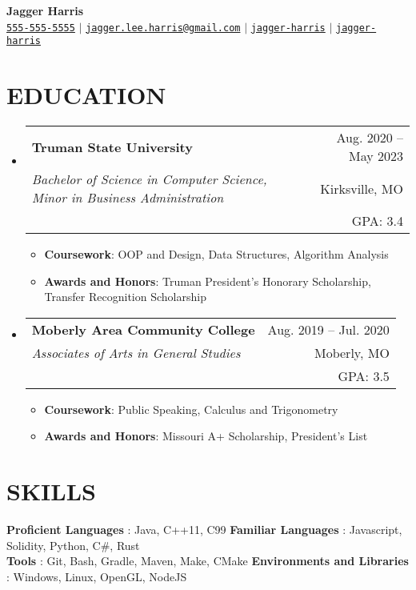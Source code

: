 \documentclass[letterpaper,11pt]{article}
\makeatletter
\newcommand{\resumeItem}[1]{
  \item\small{
    {#1 \vspace{-1pt}}
  }
}
\newcommand{\resumeSubheading}[5]{
  \vspace{-1pt}\item
    \begin{tabular*}{\textwidth}[t]{l@{\extracolsep{\fill}}r}
      \textbf{#1} & {\color{dark-grey}\small #2}\vspace{1pt}\\ %
      \textit{#3} & {\color{dark-grey} \small #4}\vspace{1pt}\\ %
      & \color{dark-grey} \small #5
    \end{tabular*}\vspace{-20pt}
}
\newcommand{\resumeSubHeadingListStart}{\begin{itemize}[leftmargin=0in, label={}]}
\newcommand{\resumeSubHeadingListEnd}{\end{itemize}}
\newcommand{\resumeItemListStart}{\begin{itemize}\setlength{\itemindent}{-1em}}
\newcommand{\resumeItemListEnd}{\end{itemize}\vspace{0pt}}
\makeatother
\begin{document}
\begin{center}
	\textbf{\Huge Jagger Harris} \\ \vspace{5pt}
	\small \faPhone* \texttt{\href{tel:+1555-555-5555}{555-555-5555}} \hspace{1pt} $|$
	\hspace{1pt} \faEnvelope \hspace{2pt} \texttt{\href{mailto:jagger.lee.harris@gmail.com}{jagger.lee.harris@gmail.com}} \hspace{1pt} $|$
	\hspace{1pt} \faGithub \hspace{2pt} \texttt{\href{https://github.com/jagger-harris}{jagger-harris}} \hspace{1pt} $|$
	\hspace{1pt} \faLinkedin \hspace{2pt} \texttt{\href{https://www.linkedin.com/in/jagger-harris/}{jagger-harris}} \hspace{1pt}
	\\ \vspace{-3pt}
\end{center}

\section{EDUCATION}
\resumeSubHeadingListStart

\resumeSubheading
{Truman State University}{Aug. 2020 -- May 2023}
{Bachelor of Science in Computer Science, Minor in Business Administration}{Kirksville, MO}
{GPA: 3.4}
\resumeItemListStart
\resumeItem {\textbf{Coursework}: OOP and Design, Data Structures, Algorithm Analysis}
\resumeItem
{\textbf{Awards and Honors}: Truman President's Honorary Scholarship, Transfer Recognition Scholarship}
\resumeItemListEnd

\resumeSubheading
{Moberly Area Community College}{Aug. 2019 -- Jul. 2020}
{Associates of Arts in General Studies}{Moberly, MO}
{GPA: 3.5}
\resumeItemListStart
\resumeItem {\textbf{Coursework}: Public Speaking, Calculus and Trigonometry}
\resumeItem
{\textbf{Awards and Honors}: Missouri A+ Scholarship, President's List}
\resumeItemListEnd
\resumeSubHeadingListEnd

\section{SKILLS}
\begin{itemize}[leftmargin=0in, label={}]
	\small{\item{
		\textbf{Proficient Languages} {: Java, C++11, C99}\vspace{2pt}
		\hfill
		\textbf{Familiar Languages} {: Javascript, Solidity, Python, C\#, Rust}\vspace{2pt} \\
		\textbf{Tools}     {: Git, Bash, Gradle, Maven, Make, CMake}
    \hfill
    \textbf{Environments and Libraries}     {: Windows, Linux, OpenGL, NodeJS}
	}}
\end{itemize}
\end{document}
